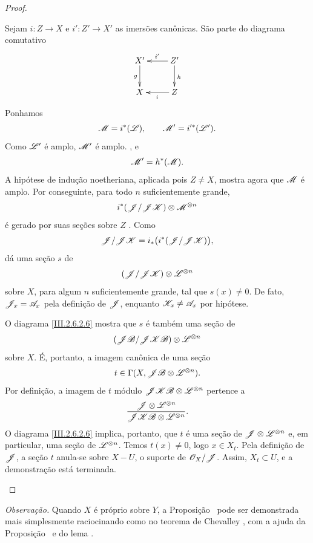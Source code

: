 \begin{proof}
\begin{env}[2.6.2.5]
Sejam $i:Z\to X$ e $i':Z'\to X'$ as imersões canônicas.
São parte do diagrama comutativo
\[
  \xymatrix{
    X'\ar[d]_g &
    Z'\ar[l]_{i'}\ar[d]^h\\
    X &
    Z\ar[l]^{i}
  }
\]
Ponhamos
\[
  \mathscr{M}=i^*(\mathscr{L}),
  \qquad
  \mathscr{M}'=i'^*(\mathscr{L}').
\]
Como $\mathscr{L}'$ é amplo, $\mathscr{M}'$ é amplo.
, e
\[
  \mathscr{M}'=h^*(\mathscr{M}).
\]
A hipótese de indução noetheriana, aplicada pois $Z\neq X$, mostra agora
que $\mathscr{M}$ é amplo.
Por conseguinte, para todo $n$ suficientemente grande,
\[
  i^*(\mathscr{J}/\mathscr{J}\mathscr{K})\otimes\mathscr{M}^{\otimes n}
\]
é gerado por suas seções sobre $Z$ .
Como
\[
  \mathscr{J}/\mathscr{J}\mathscr{K}
  =
  i_*\bigl(i^*(\mathscr{J}/\mathscr{J}\mathscr{K})\bigr),
\]
 dá uma seção $s$ de
\[
  (\mathscr{J}/\mathscr{J}\mathscr{K})\otimes\mathscr{L}^{\otimes n}
\]
sobre $X$, para algum $n$ suficientemente grande, tal que $s(x)\neq0$.
De fato, $\mathscr{J}_x=\mathscr{A}_x$ pela definição de $\mathscr{J}$, enquanto
$\mathscr{K}_x\neq\mathscr{A}_x$ por hipótese.

O diagrama \eqref{III.2.6.2.6} mostra que $s$ é também uma seção de
\[
  (\mathscr{J}\mathscr{B}/\mathscr{J}\mathscr{K}\mathscr{B})
  \otimes\mathscr{L}^{\otimes n}
\]
sobre $X$.
É, portanto, a imagem canônica de uma seção
\[
  t\in\Gamma(X,\mathscr{J}\mathscr{B}\otimes\mathscr{L}^{\otimes n}).
\]
Por definição, a imagem de $t$ módulo
$\mathscr{J}\mathscr{K}\mathscr{B}\otimes\mathscr{L}^{\otimes n}$ pertence a
\[
  \frac{\mathscr{J}\otimes\mathscr{L}^{\otimes n}}
       {\mathscr{J}\mathscr{K}\mathscr{B}\otimes\mathscr{L}^{\otimes n}}.
\]
O diagrama \eqref{III.2.6.2.6} implica, portanto, que $t$ é uma seção
de $\mathscr{J}\otimes\mathscr{L}^{\otimes n}$ e, em particular, uma seção de
$\mathscr{L}^{\otimes n}$.
Temos $t(x)\neq0$, logo $x\in X_t$.
Pela definição de $\mathscr{J}$, a seção $t$ anula-se sobre $X-U$, o
suporte de $\mathscr{O}_X/\mathscr{J}$.
Assim, $X_t\subset U$, e a demonstração está terminada.
\end{env}
\end{proof}


\begin{env}[2.6.3]
\label{III.2.6.3}
\emph{Observação.}
Quando $X$ é próprio sobre $Y$, a Proposição~ pode ser demonstrada
mais simplesmente raciocinando como no teorema de Chevalley
, com a ajuda da Proposição~ e
do lema .
\end{env}
